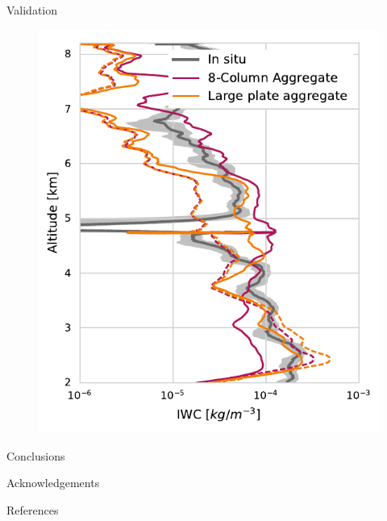 \documentclass[final,hyperref={pdfpagelabels=false}]{beamer}
\begin{document}
\begin{frame}
\begin{columns}[t]
\begin{column}{.48\linewidth}
      \begin{block}{Validation}
            \begin{figure}
            \centering
            \includegraphics[width = \textwidth]{../plots/iwc_in_situ}
            \end{figure}
      \end{block}

      \begin{block}{Conclusions}
      \end{block}

      \begin{block}{Acknowledgements}
      \end{block}

      \begin{block}{References}
        
        
      \end{block}

    \end{column}
   \end{columns}
  \end{frame}
\end{document}
